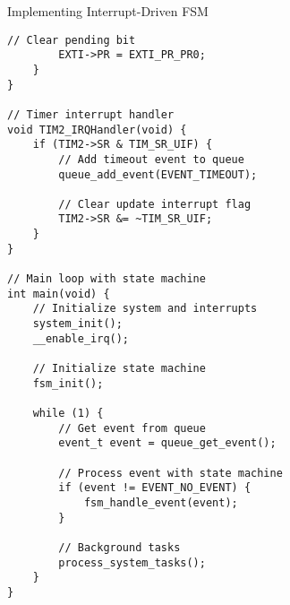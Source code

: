 \begin{KR}{Implementing Interrupt-Driven FSM}
\begin{lstlisting}[style=basesmol]
        // Clear pending bit
        EXTI->PR = EXTI_PR_PR0;
    }
}

// Timer interrupt handler
void TIM2_IRQHandler(void) {
    if (TIM2->SR & TIM_SR_UIF) {
        // Add timeout event to queue
        queue_add_event(EVENT_TIMEOUT);
        
        // Clear update interrupt flag
        TIM2->SR &= ~TIM_SR_UIF;
    }
}

// Main loop with state machine
int main(void) {
    // Initialize system and interrupts
    system_init();
    __enable_irq();
    
    // Initialize state machine
    fsm_init();
    
    while (1) {
        // Get event from queue
        event_t event = queue_get_event();
        
        // Process event with state machine
        if (event != EVENT_NO_EVENT) {
            fsm_handle_event(event);
        }
        
        // Background tasks
        process_system_tasks();
    }
}
\end{lstlisting}
\end{KR}

